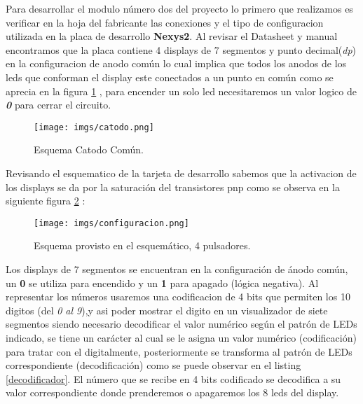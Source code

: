 \documentclass[paper=a4, fontsize=12pt]{article}        %
\numberwithin{equation}{section}                        %
\numberwithin{table}{section}                           %
\numberwithin{equation}{section}						%
\numberwithin{table}{section} 							%
\begin{document}
Para desarrollar el modulo número dos del proyecto lo primero que realizamos es verificar en la hoja del fabricante las conexiones y el tipo de configuracion utilizada en la placa de desarrollo \textbf{Nexys2}. Al revisar el Datasheet y manual encontramos que la placa contiene 4 displays de 7 segmentos y punto decimal(\textit{dp})  en la configuracion de anodo común lo cual implica que todos los anodos de los leds que conforman el display este conectados a un punto en común como se aprecia en la figura \ref{fig:catodo} , para encender un solo led necesitaremos un valor logico de \textbf{\textit{0}} para cerrar el circuito. 
\begin{figure}[H]
  \centering
     \texttt{[image: imgs/catodo.png]}
  \caption{Esquema Catodo Común.}
    \label{fig:catodo}
\end{figure}
Revisando el esquematico de la tarjeta de desarrollo sabemos que la activacion de los displays se da por la saturación del transistores pnp como se observa en la siguiente figura \ref{fig:esquema} :
\begin{figure}[H]
  \centering
     \texttt{[image: imgs/configuracion.png]}
  \caption{Esquema provisto en el esquemático, 4 pulsadores.}
    \label{fig:esquema}
\end{figure}
Los displays de 7 segmentos se encuentran en la configuración de ánodo común, un \textbf{0} se utiliza para encendido y un \textbf{1} para apagado (lógica negativa). Al representar los números usaremos una codificacion de 4 bits que permiten los 10 digitos (del \textit{0 al 9}),y asi poder mostrar el digito en un visualizador de siete segmentos siendo necesario decodificar el valor numérico según el patrón de LEDs indicado,  se tiene un carácter al cual se le asigna un valor numérico (codificación) para tratar con el digitalmente, posteriormente se transforma al patrón de LEDs correspondiente (decodificación) como se puede observar en el listing \ref{decodificador}. El número que se recibe en 4 bits codificado se decodifica a su valor correspondiente donde prenderemos o apagaremos los 8 leds del display.
\end{document}
